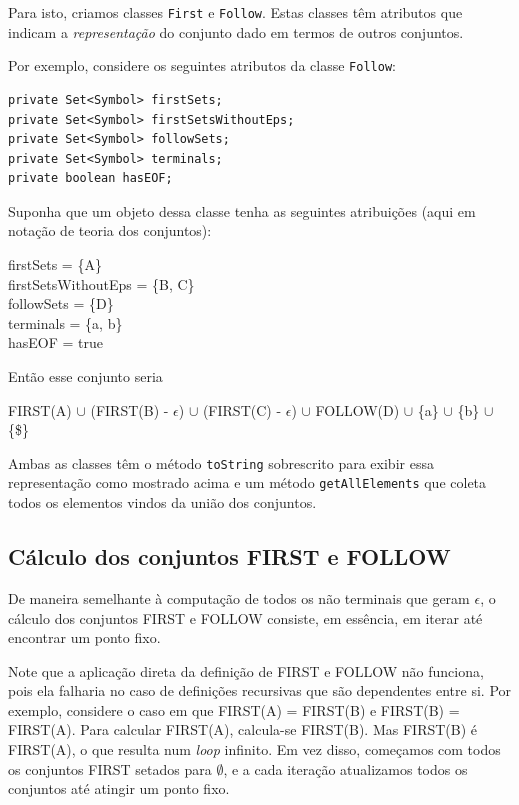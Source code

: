 \documentclass[11pt]{article}
\begin{document}
Para isto, criamos classes \texttt{First} e \texttt{Follow}. Estas classes têm atributos que
indicam a \emph{representação} do conjunto dado em termos de outros conjuntos.

Por exemplo, considere os seguintes atributos da classe \texttt{Follow}:

\begin{verbatim}
private Set<Symbol> firstSets;
private Set<Symbol> firstSetsWithoutEps;
private Set<Symbol> followSets;
private Set<Symbol> terminals;
private boolean hasEOF;
\end{verbatim}

Suponha que um objeto dessa classe tenha as seguintes atribuições (aqui em
notação de teoria dos conjuntos):

\begin{center}
firstSets = \{A\} \\
firstSetsWithoutEps = \{B, C\} \\
followSets = \{D\} \\
terminals = \{a, b\} \\
hasEOF = true \\
\end{center}

Então esse conjunto seria

\begin{center}
FIRST(A) \(\cup\) (FIRST(B) - \(\epsilon\)) \(\cup\) (FIRST(C) - \(\epsilon\)) \(\cup\) FOLLOW(D)
\(\cup\) \{a\} \(\cup\) \{b\} \(\cup\) \{\$\}
\end{center}

Ambas as classes têm o método \texttt{toString} sobrescrito para exibir essa
representação como mostrado acima e um método \texttt{getAllElements} que coleta
todos os elementos vindos da união dos conjuntos.

\subsection{Cálculo dos conjuntos FIRST e FOLLOW}
\label{sec:orgheadline8}
De maneira semelhante à computação de todos os não terminais que geram \(\epsilon\),
o cálculo dos conjuntos FIRST e FOLLOW consiste, em essência, em iterar até
encontrar um ponto fixo.

Note que a aplicação direta da definição de FIRST e FOLLOW não funciona, pois
ela falharia no caso de definições recursivas que são dependentes entre
si. Por exemplo, considere o caso em que FIRST(A) = FIRST(B) e FIRST(B) =
FIRST(A). Para calcular FIRST(A), calcula-se FIRST(B). Mas FIRST(B) é FIRST(A),
o que resulta num \emph{loop} infinito. Em vez disso, começamos com todos os
conjuntos FIRST setados para \(\emptyset\), e a cada iteração atualizamos todos os
conjuntos até atingir um ponto fixo. 
\end{document}
